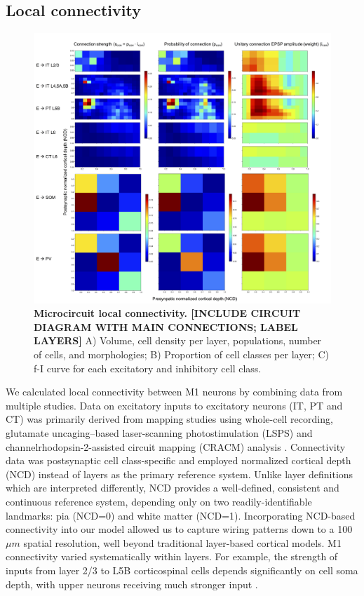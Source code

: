 \subsection{Local connectivity}

\begin{figure}[!h]  %
\centering
\includegraphics[width=\textwidth]{figs/conn_local.png}
\caption{{\bf Microcircuit local connectivity. [INCLUDE CIRCUIT DIAGRAM WITH MAIN CONNECTIONS; LABEL LAYERS]}
A) Volume, cell density per layer, populations, number of cells, and morphologies; B) Proportion of cell classes per layer; C) f-I curve for each excitatory and inhibitory cell class.}
\label{fig_conn_local}
\end{figure}

We calculated local connectivity between M1 neurons  by combining data from multiple studies. Data on excitatory inputs to excitatory neurons (IT, PT and CT) was primarily derived from mapping studies using whole-cell recording, glutamate uncaging–based laser-scanning photostimulation (LSPS) and channelrhodopsin-2-assisted circuit mapping (CRACM) analysis \cite{Weil08,Ande10,Yama15,Yama15b}. Connectivity data was postsynaptic cell class-specific and employed normalized cortical depth (NCD) instead of layers as the primary reference system. Unlike layer definitions which are interpreted differently, NCD provides a well-defined, consistent and continuous reference system, depending only on two readily-identifiable landmarks: pia (NCD=0) and white matter (NCD=1). Incorporating NCD-based connectivity into our model allowed us to capture wiring patterns down to a 100 $\mu m$ spatial resolution, well beyond traditional layer-based cortical models. M1 connectivity varied systematically within layers. For example, the strength of inputs from layer 2/3 to L5B corticospinal cells depends significantly on cell soma depth, with upper neurons receiving much stronger input \cite{Ande10}.

